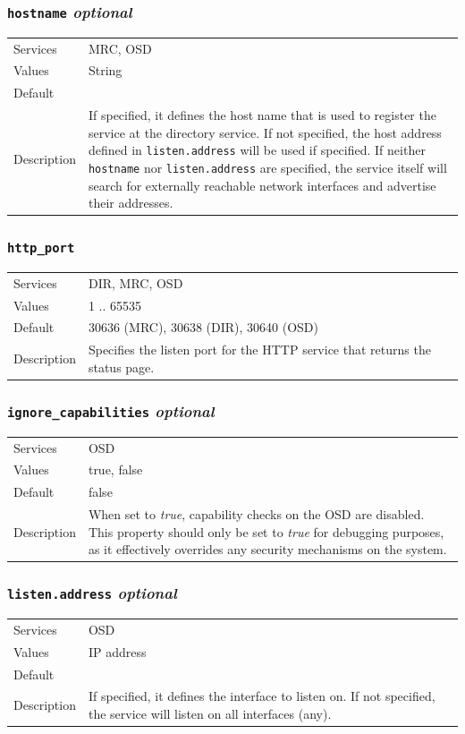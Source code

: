 \documentclass[a4paper,10pt]{book}
\begin{document}
\subsubsection{\texttt{hostname} \textit{optional}}
\begin{tabular}{lp{10cm}}
 Services & MRC, OSD\\
 Values   & String \\
 Default  & \\
 Description & If specified, it defines the host name that is used to register the service at the directory service. If not specified, the host address defined in \texttt{listen.address} will be used if specified. If neither \texttt{hostname} nor \texttt{listen.address} are specified, the service itself will search for externally reachable network interfaces and advertise their addresses.
\end{tabular}

\subsubsection{\texttt{http\_port}}
\begin{tabular}{lp{10cm}}
 Services & DIR, MRC, OSD\\
 Values   & 1 .. 65535 \\
 Default  & 30636 (MRC), 30638 (DIR), 30640 (OSD)\\
 Description & Specifies the listen port for the HTTP service that returns the status page.
\end{tabular}

\subsubsection{\texttt{ignore\_capabilities} \textit{optional}}
\begin{tabular}{lp{10cm}}
 Services & OSD\\
 Values   & true, false \\
 Default  & false\\
 Description & When set to \textit{true}, capability checks on the OSD are disabled. This property should only be set to \textit{true} for debugging purposes, as it effectively overrides any security mechanisms on the system.
\end{tabular}

\subsubsection{\texttt{listen.address} \textit{optional}}
\begin{tabular}{lp{10cm}}
 Services & OSD\\
 Values   & IP address \\
 Default  & \\
 Description & If specified, it defines the interface to listen on. If not specified, the service will listen on all interfaces (any).
\end{tabular}
\end{document}
